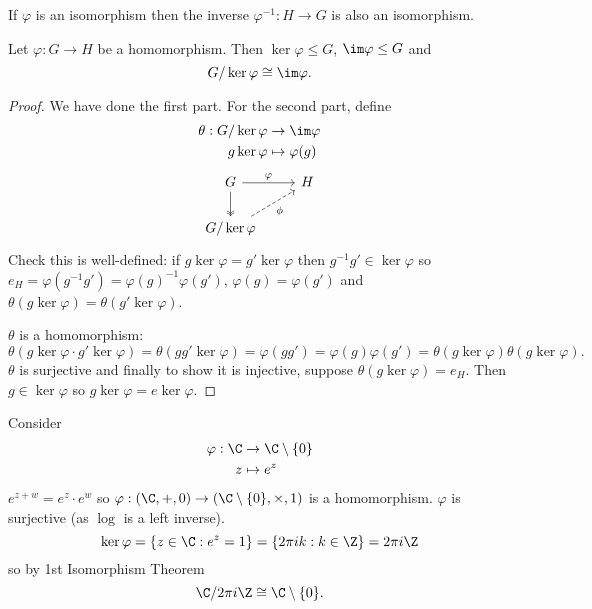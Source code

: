 \documentclass[a4paper]{article}
\theoremstyle{definition}
\begin{document}
\begin{ex}
  If \(\varphi\) is an isomorphism then the inverse \(\varphi^{-1}: H \to G\) is also an isomorphism.
\end{ex}

\begin{theorem}
  Let \(\varphi: G \to H\) be a homomorphism. Then \(\ker \varphi \leq G\), \(\im \varphi \leq G\) and
  \[
    G/\ker \varphi \cong \im \varphi.
  \]
\end{theorem}

\begin{proof}
  We have done the first part. For the second part, define
  \begin{align*}
    \theta: G/\ker \varphi &\to \im \varphi \\
    g\ker \varphi &\mapsto \varphi(g)
  \end{align*}
  \[
    \begin{tikzcd}
      G \ar[r, "\varphi"] \ar[d, two heads] & H \\
      G/\ker \varphi \ar[ur, dashed, "\phi"']
    \end{tikzcd}
  \]
  Check this is well-defined: if \(g\ker \varphi = g'\ker \varphi\) then \(g^{-1}g' \in \ker \varphi\) so \(e_H = \varphi(g^{-1}g') = \varphi(g)^{-1}\varphi(g')\), \(\varphi(g) = \varphi(g')\) and \(\theta(g\ker \varphi) = \theta(g'\ker \varphi)\).

  \(\theta\) is a homomorphism:
  \[
    \theta(g\ker \varphi \cdot g'\ker \varphi) = \theta(gg' \ker \varphi) = \varphi(gg') = \varphi(g)\varphi(g') = \theta(g\ker \varphi) \theta(g\ker \varphi).
  \]
  \(\theta\) is surjective and finally to show it is injective, suppose \(\theta(g\ker \varphi) = e_H\). Then \(g \in \ker \varphi\) so \(g\ker \varphi = e\ker \varphi\).
\end{proof}

\begin{eg}
  Consider
  \begin{align*}
    \varphi: \C &\to \C \setminus \{0\} \\
    z &\mapsto e^z
  \end{align*}
  \(e^{z + w} = e^z \cdot e^w\) so \(\varphi: (\C, +, 0) \to (\C \setminus \{0\}, \times, 1)\) is a homomorphism. \(\varphi\) is surjective (as \(\log\) is a left inverse).
  \[
    \ker \varphi = \{z \in \C: e^z = 1\} = \{2\pi ik: k \in \Z\} = 2\pi i\Z
  \]
  so by 1st Isomorphism Theorem
  \[
    \C/2\pi i\Z \cong \C \setminus \{0\}.
  \]
\end{eg}
\end{document}
